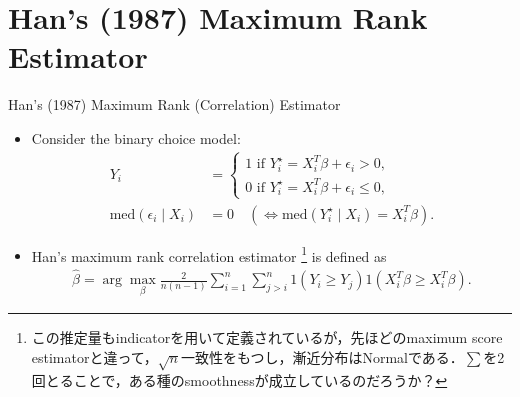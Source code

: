 \documentclass[xcolor=svgnames,dvipdfmx,cjk]{beamer}
\theoremstyle{example}
\begin{document}
\section{Han's (1987) Maximum Rank Estimator}
  
\begin{frame}{Han's (1987) Maximum Rank (Correlation) Estimator}
\begin{itemize}
  \item Consider the binary choice model:
        \begin{align*}
            Y_i &= \left\{
              \begin{array}{l}
                1 \text{ if } Y_i^{\star} = X_i^T \beta + \epsilon_i > 0, 
                \\ 
                0 \text{ if } Y_i^{\star} = X_i^T \beta + \epsilon_i \leq 0,
              \end{array}
              \right. \\
            \text{med}(\epsilon_i \mid X_i) &= 0 \quad(\iff \text{med}(Y_i^{\star}\mid X_i)=X_i^T\beta) .
        \end{align*}
  \item \alert{Han's maximum rank correlation estimator}
        \footnote{この推定量もindicatorを用いて定義されているが，先ほどのmaximum score estimatorと違って，$\sqrt{n}$一致性をもつし，漸近分布はNormalである．$\sum$を2回とることで，ある種のsmoothnessが成立しているのだろうか？}
        is defined as
        \begin{align*}
          \hat{\beta} = \arg \max_{\beta} 
                        \frac{2}{n(n-1)}
                        \sum_{i=1}^n \sum_{j>i}^n
                        1(Y_i \geq Y_j) 1(X_i^T \beta \geq X_i^T \beta).
        \end{align*}
\end{itemize}
\end{frame}  
  
\end{document}

